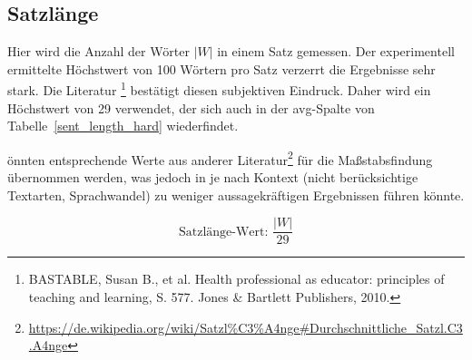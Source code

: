 \documentclass[10pt,a4paper]{article}
\begin{document}
	\subsection*{Satzlänge}
	Hier wird die Anzahl der Wörter $ |W| $ in einem Satz gemessen. Der experimentell ermittelte Höchstwert von 100 Wörtern pro Satz verzerrt die Ergebnisse sehr stark. Die Literatur \footnote{BASTABLE, Susan B., et al. Health professional as educator: principles of teaching and learning, S. 577. Jones \& Bartlett Publishers, 2010.} bestätigt diesen subjektiven Eindruck. Daher wird ein Höchstwert von 29 verwendet, der sich auch in der avg-Spalte von Tabelle~\ref{sent_length_hard} wiederfindet.
	
	önnten entsprechende Werte aus anderer Literatur\footnote{\url{https://de.wikipedia.org/wiki/Satzl\%C3\%A4nge\#Durchschnittliche_Satzl.C3.A4nge}} für die Maßstabsfindung übernommen werden, was jedoch in je nach Kontext (nicht berücksichtige Textarten, Sprachwandel) zu weniger aussagekräftigen Ergebnissen führen könnte.
		
	\begin{equation*}
		\text{Satzlänge-Wert: }\frac{|W|}{29}
	\end{equation*}	
	
\end{document}
